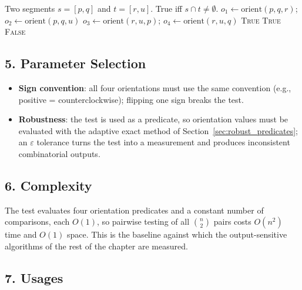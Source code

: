 \begin{algorithm}[htbp]
\caption{Segment Intersection Test}
\label{alg:pairwise_intersection}
\begin{algorithmic}[1]
\Require Two segments $s=[p,q]$ and $t=[r,u]$.
\Ensure True iff $s \cap t \neq \emptyset$.
  \State $o_1 \gets \text{orient}(p, q, r)$; $o_2 \gets \text{orient}(p, q, u)$
  \State $o_3 \gets \text{orient}(r, u, p)$; $o_4 \gets \text{orient}(r, u, q)$
    \State \Return \textsc{True}  
  \EndIf
      \State \Return \textsc{True}  
    \EndIf
  \EndFor
  \State \Return \textsc{False}
\EndFunction
\end{algorithmic}
\end{algorithm}

\subsection{5. Parameter Selection}

\begin{itemize}
\item \textbf{Sign convention}: all four orientations must use the same
  convention (e.g., positive = counterclockwise); flipping one sign breaks
  the test.
\item \textbf{Robustness}: the test is used as a predicate, so orientation
  values must be evaluated with the adaptive exact method of
  Section~\ref{sec:robust_predicates}; an $\varepsilon$ tolerance turns the
  test into a measurement and produces inconsistent combinatorial outputs.
\end{itemize}

\subsection{6. Complexity}

The test evaluates four orientation predicates and a constant number of
comparisons, each $O(1)$, so pairwise testing of all $\binom{n}{2}$ pairs
costs $O(n^2)$ time and $O(1)$ space. This is the baseline against which the
output-sensitive algorithms of the rest of the chapter are measured.

\subsection{7. Usages}


